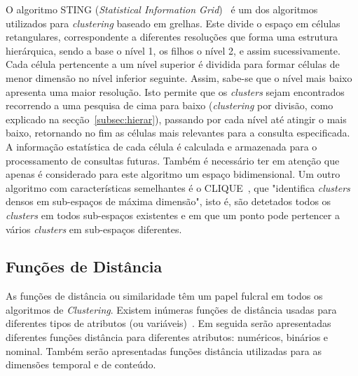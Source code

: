 O algoritmo STING (\textit{Statistical Information Grid})~\citet{Wang1997} é um dos algoritmos utilizados para \textit{clustering} baseado em grelhas. Este divide o espaço em células retangulares, correspondente a diferentes resoluções que forma uma estrutura hierárquica, sendo a base o nível 1, os filhos o nível 2, e assim sucessivamente. Cada célula pertencente a um nível superior é dividida para formar células de menor dimensão no nível inferior seguinte. Assim, sabe-se que o nível mais baixo apresenta uma maior resolução. Isto permite que os \textit{clusters} sejam encontrados recorrendo a uma pesquisa de cima para baixo (\textit{clustering} por divisão, como explicado na secção~\ref{subsec:hierar}), passando por cada nível até atingir o mais baixo, retornando no fim as células mais relevantes para a consulta especificada. A informação estatística de cada célula é calculada e armazenada para o processamento de consultas futuras. Também é necessário ter em atenção que apenas é considerado para este algoritmo um espaço bidimensional. Um outro algoritmo com características semelhantes é o CLIQUE~\citet{Agrawal1998}, que "identifica \textit{clusters} densos em sub-espaços de máxima dimensão", isto é, são detetados todos os \textit{clusters} em todos sub-espaços existentes e em que um ponto pode pertencer a vários \textit{clusters} em sub-espaços diferentes.


%

\subsection{Funções de Distância} \label{subsec:dist}

As funções de distância ou similaridade têm um papel fulcral em todos os algoritmos de \textit{Clustering}. Existem inúmeras funções de distância usadas para diferentes tipos de atributos (ou variáveis)~\citet{Liu2011}. Em seguida serão apresentadas diferentes funções distância para diferentes atributos: numéricos, binários e nominal. Também serão apresentadas funções distância utilizadas para as dimensões temporal e de conteúdo. 

